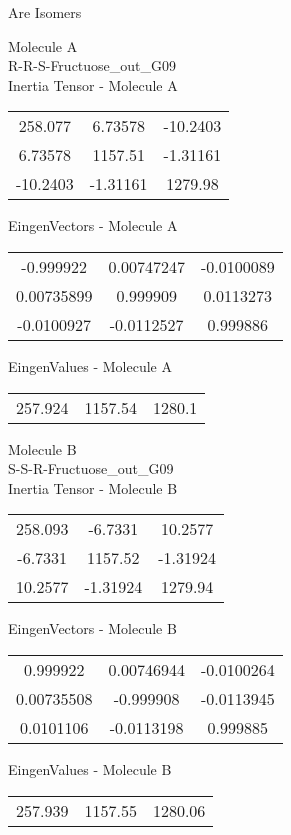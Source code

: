 \begin{center}
\vtab
\vtab
\textcolor{NavyBlue}{\Large Are Isomers}
\end{center}
\newpage
\begin{multicols}{2}
\begin{center}
Molecule A \\ 
R-R-S-Fructuose\_out\_G09
\\
Inertia Tensor - Molecule A \\
\vtab
\begin{tabular}{|c c c|}
258.077	 & 	6.73578	 & 	-10.2403	 \\
6.73578	 & 	1157.51	 & 	-1.31161	 \\
-10.2403	 & 	-1.31161	 & 	1279.98
\end{tabular}

\vtab
 EingenVectors - Molecule A     \\
\vtab
\begin{tabular}{|c c c|}
-0.999922	 & 	0.00747247	 & 	-0.0100089	 \\
0.00735899	 & 	0.999909	 & 	0.0113273	 \\
-0.0100927	 & 	-0.0112527	 & 	0.999886
\end{tabular}

\vtab
 EingenValues - Molecule A     \\
\vtab
\begin{tabular}{|c c c|}
257.924	 & 	1157.54	 & 	1280.1
\end{tabular}
\columnbreak

Molecule B \\ 
S-S-R-Fructuose\_out\_G09
\\
Inertia Tensor - Molecule B \\
\vtab
\begin{tabular}{|c c c|}
258.093	 & 	-6.7331	 & 	10.2577	 \\
-6.7331	 & 	1157.52	 & 	-1.31924	 \\
10.2577	 & 	-1.31924	 & 	1279.94
\end{tabular}

\vtab
 EingenVectors - Molecule B     \\
\vtab
\begin{tabular}{|c c c|}
0.999922	 & 	0.00746944	 & 	-0.0100264	 \\
0.00735508	 & 	-0.999908	 & 	-0.0113945	 \\
0.0101106	 & 	-0.0113198	 & 	0.999885
\end{tabular}

\vtab
 EingenValues - Molecule B     \\
\vtab
\begin{tabular}{|c c c|}
257.939	 & 	1157.55	 & 	1280.06
\end{tabular}

\end{center}
\end{multicols}

